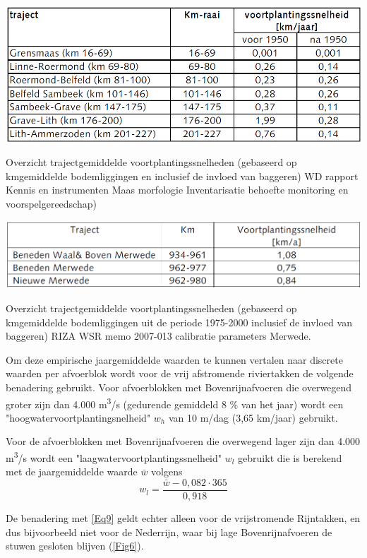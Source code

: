 \begin{table}
\includegraphics[width=\columnwidth]{figures/Tab3.png}
\caption{Overzicht trajectgemiddelde voortplantingssnelheden (gebaseerd op kmgemiddelde bodemliggingen en inclusief de invloed van baggeren) WD rapport Kennis en instrumenten Maas morfologie Inventarisatie behoefte monitoring en voorspelgereedschap)}
\label{Tab3Again}
\end{table}

\begin{table}
\includegraphics[width=\columnwidth]{figures/Tab4.png}
\caption{Overzicht trajectgemiddelde voortplantingssnelheden (gebaseerd op kmgemiddelde bodemliggingen uit de periode 1975-2000 inclusief de invloed van baggeren) RIZA WSR memo 2007-013 calibratie parameters Merwede.}
\label{Tab4}
\end{table}

Om deze empirische jaargemiddelde waarden te kunnen vertalen naar discrete waarden per afvoerblok wordt voor de vrij afstromende riviertakken de volgende benadering gebruikt.
Voor afvoerblokken met Bovenrijnafvoeren die overwegend groter zijn dan 4.000 m\textsuperscript{3}/s (gedurende gemiddeld 8 \% van het jaar) wordt een "hoogwatervoortplantingsnelheid" $w_h$ van 10 m/dag (3,65 km/jaar) gebruikt.

Voor de afvoerblokken met Bovenrijnafvoeren die overwegend lager zijn dan 4.000 m\textsuperscript{3}/s wordt een "laagwatervoortplantingssnelheid" $w_l$ gebruikt die is berekend met de jaargemiddelde waarde $\bar{w}$ volgens
%
\begin{equation}
w_l = \frac{\bar{w} - 0,082 \cdot 365}{0,918}
\label{Eq9}
\end{equation}

De benadering met \autoref{Eq9} geldt echter alleen voor de vrijstromende Rijntakken, en dus bijvoorbeeld niet voor de Nederrijn, waar bij lage Bovenrijnafvoeren de stuwen gesloten blijven (\autoref{Fig6}).

